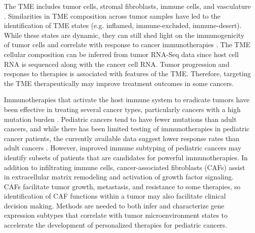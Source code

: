 \documentclass[10pt,letterpaper]{article}
\begin{document}
The TME includes tumor cells, stromal fibroblasts, immune cells, and vasculature \cite{joyceCellExclusionImmune2015}. Similarities in TME composition across tumor samples have led to the identification of TME states (e.g. inflamed, immune-excluded, immune-desert). While these states are dynamic, they can still shed light on the immunogenicity of tumor cells and correlate with response to cancer immunotherapies \cite{chenElementsCancerImmunity2017}. The TME cellular composition can be inferred from tumor RNA-Seq data since host cell RNA is sequenced along with the cancer cell RNA. Tumor progression and response to therapies is associated with features of the TME. Therefore, targeting the TME therapeutically may improve treatment outcomes in some cancers.

Immunotherapies that activate the host immune system to eradicate tumors have been effective in treating several cancer types, particularly cancers with a high mutation burden \cite{mellmanCancerImmunotherapyComes2011, pageImmuneModulationCancer2014}. Pediatric cancers tend to have fewer mutations than adult cancers, and while there has been limited testing of immunotherapies in pediatric cancer patients, the currently available data suggest lower response rates than adult cancers \cite{majzner2017harnessing,zamoraPediatricPatientsAcute2019}. However, improved immune subtyping of pediatric cancers may identify subsets of patients that are candidates for powerful immunotherapies. In addition to infiltrating immune cells, cancer-associated fibroblasts (CAFs) assist in extracellular matrix remodeling and activation of growth factor signaling. CAFs facilitate tumor growth, metastasis, and resistance to some therapies, so identification of CAF functions within a tumor may also facilitate clinical decision making. Methods are needed to both infer and characterize gene expression subtypes that correlate with tumor microenvironment states to accelerate the development of personalized therapies for pediatric cancers.
\end{document}
